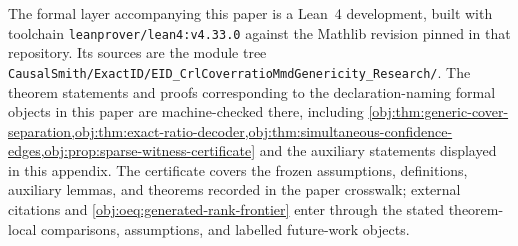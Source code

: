 The formal layer accompanying this paper is a Lean~4 development, built with toolchain \texttt{leanprover/lean4:v4.33.0} against the Mathlib revision pinned in that repository. Its sources are the module tree \texttt{CausalSmith/ExactID/EID\_CrlCoverratioMmdGenericity\_Research/}. The theorem statements and proofs corresponding to the declaration-naming formal objects in this paper are machine-checked there, including \cref{obj:thm:generic-cover-separation,obj:thm:exact-ratio-decoder,obj:thm:simultaneous-confidence-edges,obj:prop:sparse-witness-certificate} and the auxiliary statements displayed in this appendix. The certificate covers the frozen assumptions, definitions, auxiliary lemmas, and theorems recorded in the paper crosswalk; external citations and \cref{obj:oeq:generated-rank-frontier} enter through the stated theorem-local comparisons, assumptions, and labelled future-work objects.
